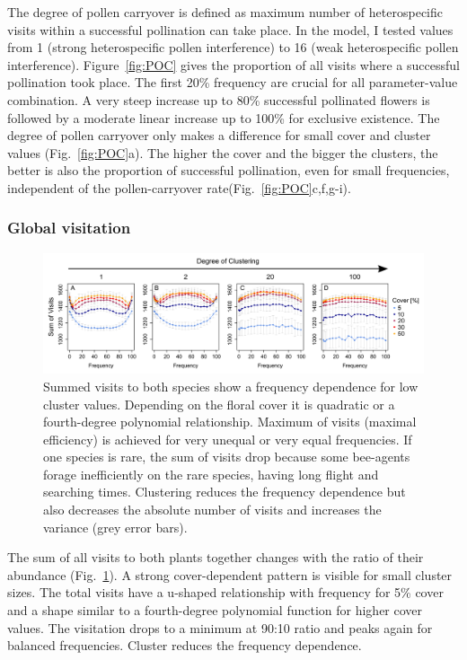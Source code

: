 The degree of pollen carryover is defined as maximum number of heterospecific visits within a successful pollination can take place. In the model, I tested values from 1 (strong heterospecific pollen interference) to 16 (weak heterospecific pollen interference). Figure~\ref{fig:POC} gives the proportion of all visits where a successful pollination took place. The first 20\% frequency are crucial for all parameter-value combination. A very steep increase up to 80\% successful pollinated flowers is followed by a moderate linear increase up to 100\% for exclusive existence. The degree of pollen carryover only makes a difference for small cover and cluster values (Fig.~\ref{fig:POC}a). The higher the cover and the bigger the clusters, the better is also the proportion of successful pollination, even for small frequencies, independent of the pollen-carryover rate(Fig.~\ref{fig:POC}c,f,g-i). 

\subsubsection*{Global visitation}

\begin{figure} [!ht] %
	\centering
	\includegraphics[width=15cm]{Images/SUM}
	\caption{Summed visits to both species show a frequency dependence for low cluster values. Depending on the floral cover it is quadratic or a fourth-degree polynomial relationship. Maximum of visits (maximal efficiency) is achieved for very unequal or very equal frequencies. If one species is rare, the sum of visits drop because some bee-agents forage inefficiently on the rare species, having long flight and searching times. Clustering reduces the frequency dependence but also decreases the absolute number of visits and increases the variance (grey error bars).}
	\label{fig:SUM}
\end{figure}

The sum of all visits to both plants together changes with the ratio of their abundance (Fig.~\ref{fig:SUM}). A strong cover-dependent pattern is visible for small cluster sizes. The total visits have a u-shaped relationship with frequency for 5\% cover and a shape similar to a fourth-degree polynomial function for higher cover values. The visitation drops to a minimum at 90:10 ratio and peaks again for balanced frequencies. Cluster reduces the frequency dependence. 

